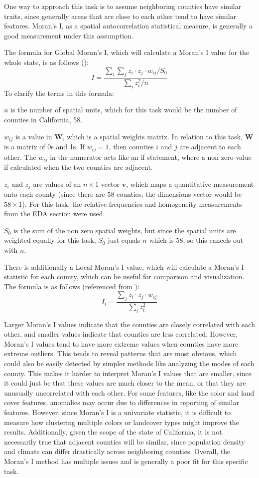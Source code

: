 \documentclass[11pt,letterpaper]{article}
\begin{document}
One way to approach this task is to assume neighboring counties have similar traits, since generally areas that are close to each other tend to have similar features. Moran’s I, as a spatial autocorrelation statistical measure, is generally a good measurement under this assumption.


The formula for Global Moran's I, which will calculate a Moran's I value for the whole state, is as follows (\cite{anselingeoda}): 
\[I = \frac{\sum_i\sum_j z_i\cdot z_j\cdot w_{ij} /S_0}{\sum_i z_i^2/n}\]
To clarify the terms in this formula:

$n$ is the number of spatial units, which for this task would be the number of counties in California, 58.

$w_{ij}$ is a value in $\mathbf{W}$, which is a spatial weights matrix. In relation to this task, $\mathbf{W}$ is a matrix of 0s and 1s. If $w_{ij} = 1$, then counties $i$ and $j$ are adjacent to each other. The $w_{ij}$ in the numerator acts like an if statement, where a non zero value if calculated when the two counties are adjacent.

$z_i$ and $z_j$ are values of an $n \times 1$ vector $\mathbf{v}$, which maps a quantitative measurement onto each county (since there are 58 counties, the dimensions vector would be $58 \times 1$). For this task, the relative frequencies and homogeneity measurements from the EDA section were used. 

$S_0$ is the sum of the non zero spatial weights, but since the spatial units are weighted equally for this task, $S_0$ just equals $n$ which is 58, so this cancels out with $n$.

There is additionally a Local Moran's I value, which will calculate a Moran's I statistic for each county, which can be useful for comparison and visualization. The formula is as follows (referenced from \cite{anselingeoda}):
\[I_i = \frac{\sum_j z_i\cdot z_j\cdot w_{ij}}{\sum_i z_i^2}\]

Larger Moran’s I values indicate that the counties are closely correlated with each other, and smaller values indicate that counties are less correlated. However, Moran’s I values tend to have more extreme values when counties have more extreme outliers. This tends to reveal patterns that are most obvious, which could also be easily detected by simpler methods like analyzing the modes of each county. This makes it harder to interpret Moran’s I values that are smaller, since it could just be that these values are much closer to the mean, or that they are unusually uncorrelated with each other. For some features, like the color and land cover features, anomalies may occur due to differences in reporting of similar features. However, since Moran's I is a univariate statistic, it is difficult to measure how clustering multiple colors or landcover types might improve the results. Additionally, given the scope of the state of California, it is not necessarily true that adjacent counties will be similar, since population density and climate can differ drastically across neighboring counties. Overall, the Moran's I method has multiple issues and is generally a poor fit for this specific task. 
\end{document}
